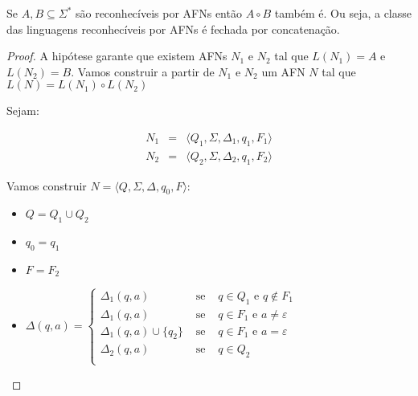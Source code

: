 \begin{lemma}
Se $A, B \subseteq \Sigma^*$ são reconhecíveis por AFNs então $A \circ B$ também é.
  Ou seja, a classe das linguagens reconhecíveis por AFNs é fechada por concatenação.
\end{lemma}
\begin{proof}
  A hipótese garante que existem AFNs $N_1$ e $N_2$ tal que $L(N_1) = A$ e $L(N_2) = B$.
  Vamos construir a partir de $N_1$ e $N_2$ um AFN $N$ tal que $L(N) = L(N_1) \circ L(N_2)$

  Sejam:

  \begin{eqnarray*}
    N_1 & = & \langle Q_1, \Sigma, \Delta_1, q_1, F_1 \rangle\\
    N_2 & = & \langle Q_2, \Sigma, \Delta_2, q_1, F_2 \rangle
  \end{eqnarray*}

  Vamos construir $N = \langle Q, \Sigma, \Delta, q_0, F \rangle$:

  \begin{itemize}
  \item[] $Q = Q_1 \cup Q_2$
  \item[] $q_0 = q_1$
  \item[] $F = F_2$
  \item[] $\Delta(q,a) = \left\{
    \begin{array}{ccc}
      \Delta_1(q, a) & \textrm{ se } & q \in Q_1 \textrm{ e } q \notin F_1\\
      \Delta_1(q, a) & \textrm{ se } & q \in F_1 \textrm{ e } a \neq \varepsilon\\
      \Delta_1(q, a) \cup \{q_2\} & \textrm{ se } & q \in F_1 \textrm{ e } a = \varepsilon\\
      \Delta_2(q, a) & \textrm{ se } & q \in Q_2\\
     \end{array}\right.$
  \end{itemize}


\end{proof}
